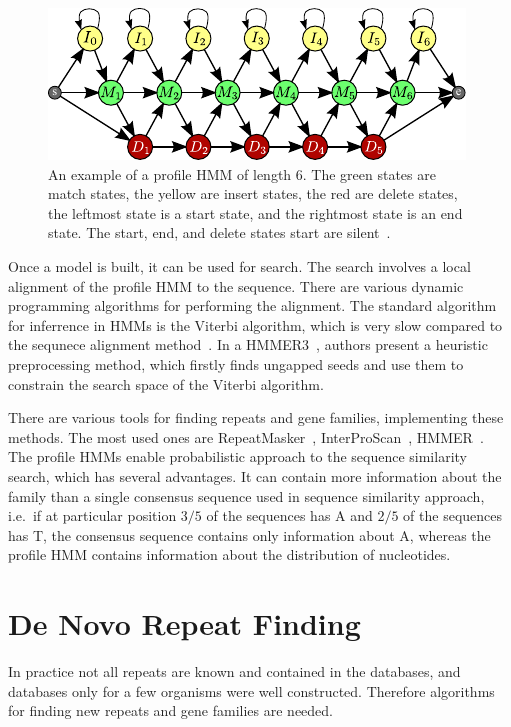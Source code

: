 \begin{figure}[htp]
    \centering
    \includegraphics[width=.7\textwidth]{../figures/profile_hmm}
    \caption[Profile HMM]{An example of a profile HMM of length 6. The green states are match states, the yellow are insert states, the red are delete states, the leftmost state is a start state, and the rightmost state is an end state.
    The start, end, and delete states start are silent~\cite{nanasi2014probabilistic}.}\label{fig:profile-hmm}
\end{figure}

Once a model is built, it can be used for search. The search involves a local alignment of the profile HMM to the sequence.
There are various dynamic programming algorithms for performing the alignment. The standard algorithm for inferrence in HMMs is the Viterbi algorithm, which is very slow compared to the sequnece alignment method~\cite{eddy2011accelerated}. In a HMMER3~\cite{eddy2011accelerated}, authors present a heuristic preprocessing method, which firstly finds ungapped seeds and use them to constrain the search space of the Viterbi algorithm.

There are various tools for finding repeats and gene families, implementing these methods.
The most used ones are RepeatMasker~\cite{repeatmasker}, InterProScan~\cite{mitchell2015interpro}, HMMER~\cite{eddy2011accelerated}.
The profile HMMs enable probabilistic approach to the sequence similarity search, which has several advantages. It can contain more information about the family than a single consensus sequence used in sequence similarity approach, i.e.\ if at particular position $3/5$ of the sequences has A and $2/5$ of the sequences has T, the consensus sequence contains only information about A, whereas the profile HMM contains information about the distribution of nucleotides.

\section{De Novo Repeat Finding}

In practice not all repeats are known and contained in the databases, and databases only for a few organisms were well constructed. Therefore algorithms for finding new repeats and gene families are needed.


